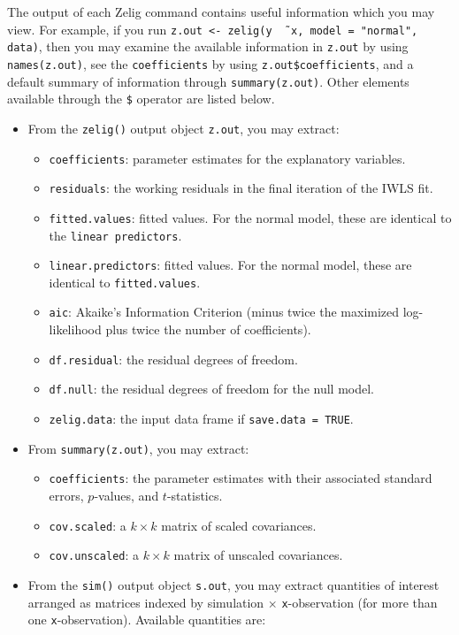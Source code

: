 \documentclass{article}
\begin{document}
The output of each Zelig command contains useful information which you
may view.  For example, if you run \texttt{z.out <- zelig(y \~\,
  x, model = "normal", data)}, then you may examine the available
information in \texttt{z.out} by using \texttt{names(z.out)},
see the {\tt coefficients} by using {\tt z.out\$coefficients}, and
a default summary of information through \texttt{summary(z.out)}.
Other elements available through the {\tt \$} operator are listed
below.

\begin{itemize}
\item From the {\tt zelig()} output object {\tt z.out}, you may extract:
   \begin{itemize}
   \item {\tt coefficients}: parameter estimates for the explanatory
     variables.
   \item {\tt residuals}: the working residuals in the final iteration
     of the IWLS fit.
   \item {\tt fitted.values}: fitted values.  For the normal model,
     these are identical to the {\tt linear predictors}.
   \item {\tt linear.predictors}: fitted values.  For the normal
     model, these are identical to {\tt fitted.values}.
   \item {\tt aic}: Akaike's Information Criterion (minus twice the
     maximized log-likelihood plus twice the number of coefficients).
   \item {\tt df.residual}: the residual degrees of freedom.
   \item {\tt df.null}: the residual degrees of freedom for the null
     model.
   \item {\tt zelig.data}: the input data frame if {\tt save.data = TRUE}.  
   \end{itemize}

\item From {\tt summary(z.out)}, you may extract: 
   \begin{itemize}
   \item {\tt coefficients}: the parameter estimates with their
     associated standard errors, $p$-values, and $t$-statistics.
   \item{\tt cov.scaled}: a $k \times k$ matrix of scaled covariances.
   \item{\tt cov.unscaled}: a $k \times k$ matrix of unscaled
     covariances.  
   \end{itemize}

\item From the {\tt sim()} output object {\tt s.out}, you may extract
  quantities of interest arranged as matrices indexed by simulation
  $\times$ {\tt x}-observation (for more than one {\tt x}-observation).
  Available quantities are:


\end{itemize}
\end{document}
